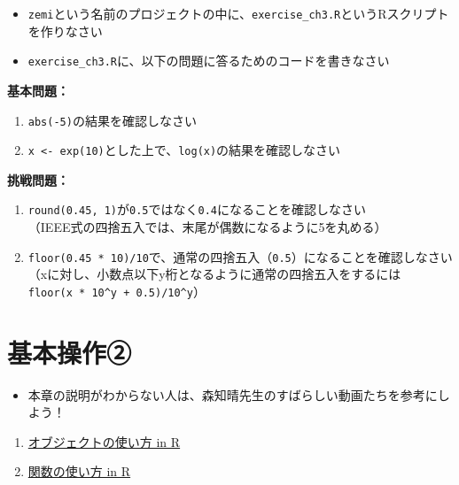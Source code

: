 \documentclass[
]{book}
\providecommand{\tightlist}{%
  \setlength{\itemsep}{0pt}\setlength{\parskip}{0pt}}
\begin{document}
\begin{itemize}
\tightlist
\item
  \texttt{zemi}という名前のプロジェクトの中に、\texttt{exercise\_ch3.R}というRスクリプトを作りなさい\\
\item
  \texttt{exercise\_ch3.R}に、以下の問題に答るためのコードを書きなさい
\end{itemize}

\textbf{基本問題：}

\begin{enumerate}
\def\labelenumi{\arabic{enumi}.}
\tightlist
\item
  \texttt{abs(-5)}の結果を確認しなさい\\
\item
  \texttt{x\ \textless{}-\ exp(10)}とした上で、\texttt{log(x)}の結果を確認しなさい
\end{enumerate}

\textbf{挑戦問題：}

\begin{enumerate}
\def\labelenumi{\arabic{enumi}.}
\tightlist
\item
  \texttt{round(0.45,\ 1)}が\texttt{0.5}ではなく\texttt{0.4}になることを確認しなさい\\
  （IEEE式の四捨五入では、末尾が偶数になるように5を丸める）
\item
  \texttt{floor(0.45\ *\ 10)/10}で、通常の四捨五入（\texttt{0.5}）になることを確認しなさい\\
  （xに対し、小数点以下y桁となるように通常の四捨五入をするには\texttt{floor(x\ *\ 10\^{}y\ +\ 0.5)/10\^{}y}）
\end{enumerate}

\hypertarget{ux57faux672cux64cdux4f5cux2461}{%
\chapter{基本操作②}\label{ux57faux672cux64cdux4f5cux2461}}

\begin{itemize}
\tightlist
\item
  本章の説明がわからない人は、森知晴先生のすばらしい動画たちを参考にしよう！
\end{itemize}

\begin{enumerate}
\def\labelenumi{\arabic{enumi}.}
\tightlist
\item
  \href{https://youtu.be/CblsIBlzqX0}{オブジェクトの使い方 in R}\\
\item
  \href{https://youtu.be/q8MI6P2hoUM}{関数の使い方 in R}
\end{enumerate}
\end{document}
